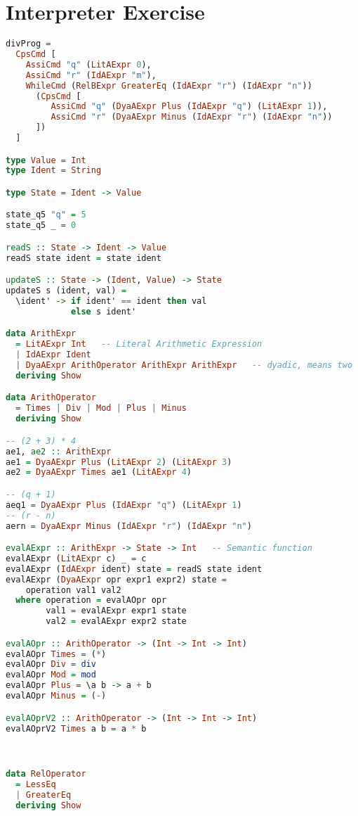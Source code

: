 \section{Interpreter Exercise}

\begin{lstlisting}[language=Haskell]
divProg =
  CpsCmd [
    AssiCmd "q" (LitAExpr 0),
    AssiCmd "r" (IdAExpr "m"),
    WhileCmd (RelBExpr GreaterEq (IdAExpr "r") (IdAExpr "n"))
      (CpsCmd [
         AssiCmd "q" (DyaAExpr Plus (IdAExpr "q") (LitAExpr 1)),
         AssiCmd "r" (DyaAExpr Minus (IdAExpr "r") (IdAExpr "n"))
      ])
  ]

type Value = Int
type Ident = String

type State = Ident -> Value

state_q5 "q" = 5
state_q5 _ = 0

readS :: State -> Ident -> Value
readS state ident = state ident

updateS :: State -> (Ident, Value) -> State
updateS s (ident, val) =
  \ident' -> if ident' == ident then val
             else s ident'

data ArithExpr
  = LitAExpr Int   -- Literal Arithmetic Expression
  | IdAExpr Ident
  | DyaAExpr ArithOperator ArithExpr ArithExpr   -- dyadic, means two
  deriving Show

data ArithOperator
  = Times | Div | Mod | Plus | Minus
  deriving Show

-- (2 + 3) * 4
ae1, ae2 :: ArithExpr
ae1 = DyaAExpr Plus (LitAExpr 2) (LitAExpr 3)
ae2 = DyaAExpr Times ae1 (LitAExpr 4)

-- (q + 1)
aeq1 = DyaAExpr Plus (IdAExpr "q") (LitAExpr 1)
-- (r - n)
aern = DyaAExpr Minus (IdAExpr "r") (IdAExpr "n")

evalAExpr :: ArithExpr -> State -> Int   -- Semantic function
evalAExpr (LitAExpr c) _ = c
evalAExpr (IdAExpr ident) state = readS state ident
evalAExpr (DyaAExpr opr expr1 expr2) state =
    operation val1 val2
  where operation = evalAOpr opr
        val1 = evalAExpr expr1 state
        val2 = evalAExpr expr2 state

evalAOpr :: ArithOperator -> (Int -> Int -> Int)
evalAOpr Times = (*)
evalAOpr Div = div
evalAOpr Mod = mod
evalAOpr Plus = \a b -> a + b
evalAOpr Minus = (-)

evalAOprV2 :: ArithOperator -> (Int -> Int -> Int)
evalAOprV2 Times a b = a * b



data RelOperator
  = LessEq
  | GreaterEq
  deriving Show


\end{lstlisting}
